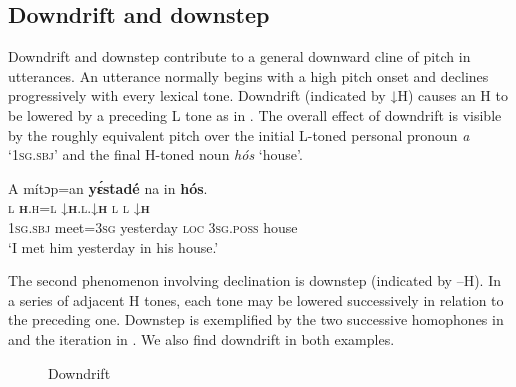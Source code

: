\subsection{Downdrift and downstep}\label{sec:3.2.3}

Downdrift and downstep contribute to a general downward cline of pitch in utterances. An utterance normally begins with a high pitch onset and declines progressively with every lexical tone. Downdrift (indicated by ↓H) causes an H to be lowered by a preceding L tone as in . The overall effect of downdrift is visible by the roughly equivalent pitch over the initial L-toned personal pronoun \textit{a} ‘\textsc{1sg.sbj}’ and the final H-toned noun \textit{hós} ‘house’.




\ea%
    \label{ex:key:55}
    \glll   A    mítɔp=an  \textbf{yɛ́stadé}    na  in  \textbf{hós}.\\
\textsc{l}    \textbf{\textmd{\textsc{h}}}\textsc{.h=l}    \textsc{↓}\textbf{\textsc{h}}\textsc{.l.↓}\textbf{\textsc{h}}    \textsc{l}  \textsc{l}  \textsc{↓}\textbf{\textsc{h}} \\
\textsc{1sg.sbj}  meet=\textsc{3sg}  yesterday  \textsc{loc}  \textsc{3sg.poss}  house\\
\glt ‘I met him yesterday in his house.’    
\z


The second phenomenon involving declination is downstep (indicated by –H). In a series of adjacent H tones, each tone may be lowered successively in relation to the preceding one. Downstep is exemplified  by the two successive homophones in  and the iteration in . We also find downdrift in both examples.

 \clearpage
 
 \begin{figure}[p]
\caption{Downdrift}
\label{fig:key:3.16}
\end{figure}


